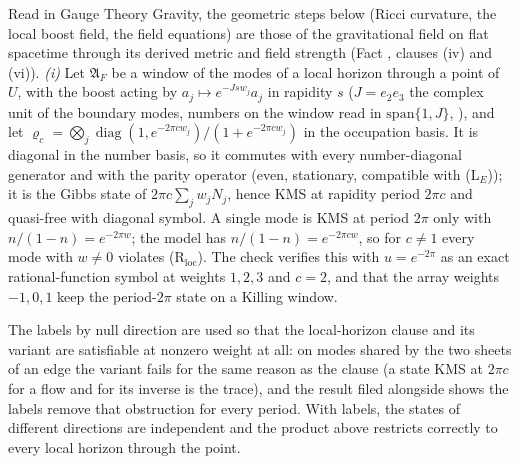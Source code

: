 Read in Gauge Theory Gravity, the geometric steps below (Ricci curvature, the local boost field, the field equations) are those of the gravitational field on flat spacetime through its derived metric and field strength (Fact , clauses (iv) and (vi)). \emph{(i)} Let $\mathfrak{A}_{F}$ be a window of the modes of a local horizon through a point of $U$, with the boost acting by $a_{j} \mapsto e^{-Jsw_{j}}a_{j}$ in rapidity $s$ ($J = e_{2}e_{3}$ the complex unit of the boundary modes, numbers on the window read in $\mathrm{span}\{1, J\}$, ), and let $\varrho_{c} = \bigotimes_{j}\operatorname{diag}(1, e^{-2\pi cw_{j}})/(1 + e^{-2\pi cw_{j}})$ in the occupation basis. It is diagonal in the number basis, so it commutes with every number-diagonal generator and with the parity operator (even, stationary, compatible with (L$_E$)); it is the Gibbs state of $2\pi c\sum_{j}w_{j}N_{j}$, hence KMS at rapidity period $2\pi c$ and quasi-free with diagonal symbol. A single mode is KMS at period $2\pi$ only with $n/(1 - n) = e^{-2\pi w}$; the model has $n/(1 - n) = e^{-2\pi cw}$, so for $c \neq 1$ every mode with $w \neq 0$ violates (R$_{\mathrm{loc}}$). The check verifies this with $u = e^{-2\pi}$ as an exact rational-function symbol at weights $1, 2, 3$ and $c = 2$, and that the array weights $-1, 0, 1$ keep the period-$2\pi$ state on a Killing window.

The labels by null direction are used so that the local-horizon clause and its variant are satisfiable at nonzero weight at all: on modes shared by the two sheets of an edge the variant fails for the same reason as the clause (a state KMS at $2\pi c$ for a flow and for its inverse is the trace), and the result filed alongside shows the labels remove that obstruction for every period. With labels, the states of different directions are independent and the product above restricts correctly to every local horizon through the point.

